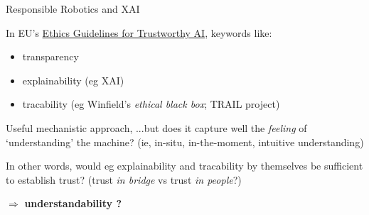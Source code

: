 \documentclass[xcolor=table,aspectratio=169]{beamer}
\begin{document}
\begin{frame}{Responsible Robotics and XAI}

    In EU's \href{https://digital-strategy.ec.europa.eu/en/library/ethics-guidelines-trustworthy-ai}{Ethics Guidelines
    for Trustworthy AI}, keywords like:

    \begin{itemize}
        \item transparency
        \item explainability (eg XAI)
        \item tracability (eg Winfield's \emph{ethical black box}; TRAIL project)
    \end{itemize}

    \pause

    Useful mechanistic approach, ...but does it capture well the \emph{feeling}
    of `understanding' the machine? (ie, in-situ, in-the-moment, intuitive
    understanding)


    \pause

    In other words, would eg explainability and tracability by themselves be
    sufficient to establish trust? {\footnotesize (trust \emph{in bridge} vs trust \emph{in
    people}?)}

    $\Rightarrow$ {\bf understandability ?}

\end{frame}
%
%
%
%
%
%
\end{document}
